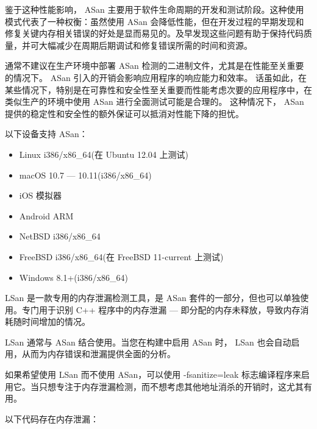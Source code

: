 鉴于这种性能影响， ASan 主要用于软件生命周期的开发和测试阶段。这种使用模式代表了一种权衡：虽然使用 ASan 会降低性能，但在开发过程的早期发现和修复关键内存相关错误的好处是显而易见的。及早发现这些问题有助于保持代码质量，并可大幅减少在周期后期调试和修复错误所需的时间和资源。

通常不建议在生产环境中部署 ASan 检测的二进制文件，尤其是在性能至关重要的情况下。 ASan 引入的开销会影响应用程序的响应能力和效率。 话虽如此，在某些情况下，特别是在可靠性和安全性至关重要而性能考虑次要的应用程序中，在类似生产的环境中使用 ASan 进行全面测试可能是合理的。 这种情况下， ASan 提供的稳定性和安全性的额外保证可以抵消对性能下降的担忧。

以下设备支持 ASan：

\begin{itemize}
\item
Linux i386/x86\_64(在 Ubuntu 12.04 上测试)

\item
macOS 10.7 --- 10.11(i386/x86\_64)

\item
iOS 模拟器

\item
Android ARM

\item
NetBSD i386/x86\_64

\item
FreeBSD i386/x86\_64(在 FreeBSD 11-current 上测试)

\item
Windows 8.1+(i386/x86\_64)
\end{itemize}


LSan 是一款专用的内存泄漏检测工具，是 ASan 套件的一部分，但也可以单独使用。专门用于识别 C++ 程序中的内存泄漏 --- 即分配的内存未释放，导致内存消耗随时间增加的情况。


LSan 通常与 ASan 结合使用。当您在构建中启用 ASan 时， LSan 也会自动启用，从而为内存错误和泄漏提供全面的分析。


如果希望使用 LSan 而不使用 ASan，可以使用 -fsanitize=leak 标志编译程序来启用它。当只想专注于内存泄漏检测，而不想考虑其他地址消杀的开销时，这尤其有用。


以下代码存在内存泄漏：

